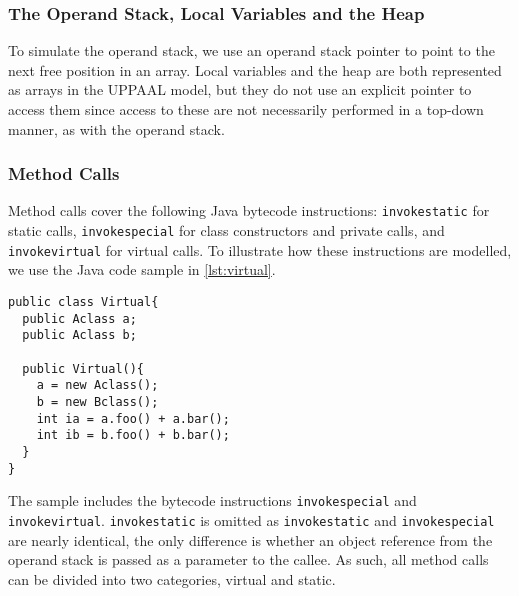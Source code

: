 \subsubsection{The Operand Stack, Local Variables and the Heap}
To simulate the operand stack, we use an operand stack pointer to point to the next free position in an array. Local variables and the heap are both represented as arrays in the UPPAAL model, but they do not use an explicit pointer to access them since access to these are not necessarily performed in a top-down manner, as with the operand stack.

\subsubsection{Method Calls}\label{subsubsec:method}
Method calls cover the following Java bytecode instructions: \texttt{invokestatic} for static calls, \texttt{invokespecial} for class constructors and private calls, and \texttt{invokevirtual} for virtual calls. To illustrate how these instructions are modelled, we use the Java code sample in \cref{lst:virtual}.
\begin{lstlisting}[caption={\texttt{Bclass} extends \texttt{Aclass}, \texttt{Aclass} implements the methods foo and bar, and \texttt{Bclass} overwrites foo.}, label={lst:virtual}]
public class Virtual{
  public Aclass a;
  public Aclass b;

  public Virtual(){
    a = new Aclass();
    b = new Bclass();
    int ia = a.foo() + a.bar();
    int ib = b.foo() + b.bar();
  }
}
\end{lstlisting}
The sample includes the bytecode instructions \texttt{invokespecial} and \texttt{invokevirtual}.
\texttt{invokestatic} is omitted as \texttt{invokestatic} and \texttt{invokespecial} are nearly identical, the only difference is whether an object reference from the operand stack is passed as a parameter to the callee.
As such, all method calls can be divided into two categories, virtual and static.

